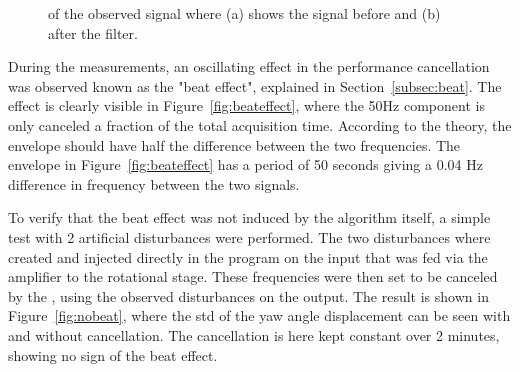 \begin{figure}[h!]
  \centering %
  \qquad
  \caption{\label{fig:bandpass_imp} \abbrFFT of the observed signal where (a) shows the signal before and (b) after the filter.}
\end{figure}
\FloatBarrier
During the measurements, an oscillating effect in the performance cancellation was observed known as the "beat effect", explained in Section~\ref{subsec:beat}. The effect is clearly visible in Figure~\ref{fig:beateffect}, where the 50Hz component is only canceled a fraction of the total acquisition time. According to the theory, the envelope should have half the difference between the two frequencies. The envelope in Figure~\ref{fig:beateffect} has a period of 50 seconds giving a 0.04 Hz difference in frequency between the two signals.

To verify that the beat effect was not induced by the algorithm itself, a simple test with 2 artificial disturbances were performed. The two disturbances where created and injected directly in the program on the input that was fed via the amplifier to the rotational stage. These frequencies were then set to be canceled by the \abbrRFDC, using the observed disturbances on the output. The result is shown in Figure~\ref{fig:nobeat}, where the std of the yaw angle displacement can be seen with and without cancellation. The cancellation is here kept constant over 2 minutes, showing no sign of the beat effect.

